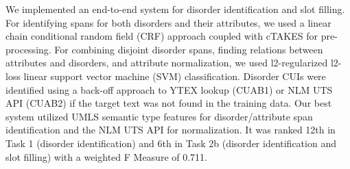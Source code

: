 We implemented an end-to-end system for disorder identification and slot filling. For identifying spans for both disorders and their attributes, we used a linear chain conditional random field (CRF) approach coupled with cTAKES for pre-processing.  For combining disjoint disorder spans, finding relations between attributes and disorders, and attribute normalization, we used l2-regularized l2-loss linear support vector machine (SVM) classification. Disorder CUIs were identified using a back-off approach to YTEX lookup (CUAB1) or NLM UTS API (CUAB2) if the target text was not found in the training data. Our best system utilized UMLS semantic type features for disorder/attribute span identification and the NLM UTS API for normalization. It was ranked 12th in Task 1 (disorder identification) and 6th in Task 2b (disorder identification and slot filling) with a weighted F Measure of 0.711.

